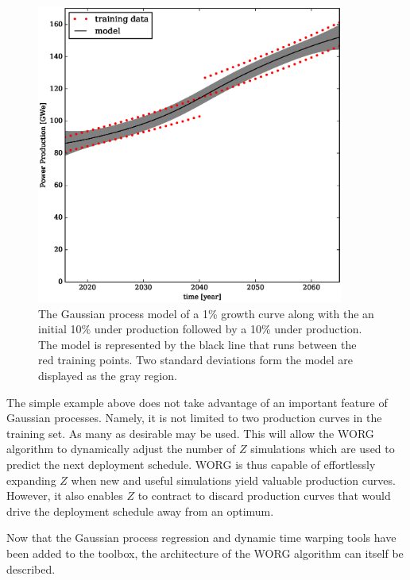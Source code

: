 \begin{figure}[htb]
\centering
\includegraphics[width=0.9\textwidth]{gwe-model-.eps}
\caption{The Gaussian process model of a 1\% growth curve along with the
an initial 10\% under production followed by a 10\% under production.
The model is represented by the black line that runs between the red
training points. Two standard deviations form the model are displayed as the
gray region.}
\label{gwe-model-}
\end{figure}

The simple example above does not take advantage of an important
feature of Gaussian processes. Namely, it is not limited to two production
curves in the training set.  As many as desirable may be used.  This will
allow the WORG algorithm to dynamically adjust the number of $Z$ simulations
which are used to predict the next deployment schedule. WORG is thus capable
of
effortlessly expanding $Z$ when new and useful simulations yield valuable production
curves.  However, it also enables $Z$ to contract to discard production
curves that would drive the deployment schedule away from an optimum.

Now that the Gaussian process regression and dynamic time warping tools have
been added to the toolbox, the architecture of the WORG algorithm can
itself be described.

\clearpage
